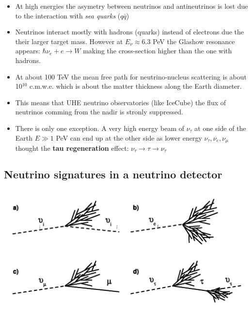 \documentclass[
  letterpaper,
  DIV=11,
  numbers=noendperiod]{scrreprt}
\begin{document}
\begin{itemize}
\item
  At high energies the asymetry between neutrinos and antineutrinos is
  lost due to the interaction with \emph{sea quarks} (\(q\bar{q}\))
\item
  Neutrinos interact mostly with hadrons (quarks) instead of electrons
  due the their larger target mass. However at \(E_\nu \approx 6.3\) PeV
  the Glashow resonance appears: \({\hbar \nu_e} + e \rightarrow W\)
  making the cross-section higher than the one with hadrons.
\end{itemize}

\begin{tcolorbox}[enhanced jigsaw, colframe=quarto-callout-note-color-frame, leftrule=.75mm, left=2mm, opacitybacktitle=0.6, colbacktitle=quarto-callout-note-color!10!white, coltitle=black, arc=.35mm, titlerule=0mm, toprule=.15mm, opacityback=0, bottomrule=.15mm, breakable, bottomtitle=1mm, rightrule=.15mm, toptitle=1mm, colback=white, title=\textcolor{quarto-callout-note-color}{\faInfo}\hspace{0.5em}{Earth is opaque to PeV neutrinos}]

\begin{itemize}
\item
  At about 100 TeV the mean free path for neutrino-nucleus scattering is
  about 10\(^{10}\) c.m.w.e. which is about the matter thickness along
  the Earth diameter.
\item
  This means that UHE neutrino observatories (like IceCube) the flux of
  neutrinos comming from the nadir is stronly suppressed.
\item
  There is only one exception. A very high energy beam of \(\nu_\tau\)
  at one side of the Earth \(E\gg 1\) PeV can end up at the other side
  as lower energy \(\nu_\tau, \nu_e,\nu_\mu\) thought the \textbf{tau
  regeneration} effect:
  \(\nu_\tau \rightarrow \tau \rightarrow \nu_\tau\)
\end{itemize}

\end{tcolorbox}

\subsection{Neutrino signatures in a neutrino
detector}\label{neutrino-signatures-in-a-neutrino-detector}

\begin{center}
\includegraphics{images/nu_signatures.png}
\end{center}
\end{document}
